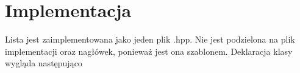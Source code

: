	\newpage
\section{Implementacja}		%

Lista jest zaimplementowana jako jeden plik .hpp. Nie jest podzielona na plik implementacji oraz nagłówek, ponieważ jest ona szablonem. Deklaracja klasy wygląda następująco

